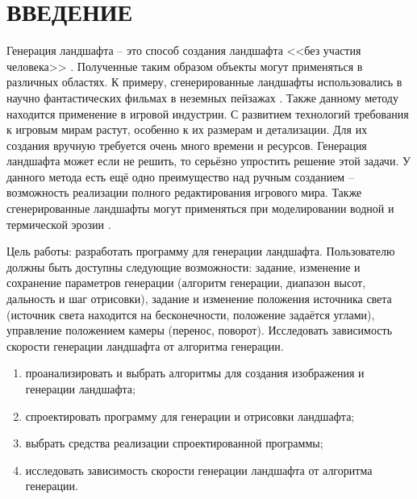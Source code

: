 \chapter*{ВВЕДЕНИЕ}

Генерация ландшафта -- это способ создания ландшафта <<без участия человека>> \cite{researchITMO}. Полученные таким образом объекты могут применяться в различных областях. К примеру, сгенерированные ландшафты использовались в научно фантастических фильмах в неземных пейзажах \cite{openGL}. Также данному методу находится применение в игровой индустрии. С развитием технологий требования к игровым мирам растут, особенно к их размерам и детализации. Для их создания вручную требуется очень много времени и ресурсов. Генерация ландшафта может если не решить, то серьёзно упростить решение этой задачи. У данного метода есть ещё одно преимущество над ручным созданием – возможность реализации полного редактирования игрового мира. Также сгенерированные ландшафты могут применяться при моделировании водной и термической эрозии \cite{algorithms}.

Цель работы: разработать программу для генерации ландшафта. Пользователю должны быть доступны следующие возможности: задание, изменение и сохранение параметров генерации (алгоритм генерации, диапазон высот, дальность и шаг отрисовки), задание и изменение положения источника света (источник света находится на бесконечности, положение задаётся углами), управление положением камеры (перенос, поворот). Исследовать зависимость скорости генерации ландшафта от алгоритма генерации.

\begin{enumerate}[label={\arabic*)}]
	\item проанализировать и выбрать алгоритмы для создания изображения и генерации ландшафта;
	\item спроектировать программу для генерации и отрисовки ландшафта;
	\item выбрать средства реализации спроектированной программы;
	\item исследовать зависимость скорости генерации ландшафта от алгоритма генерации.
\end{enumerate}